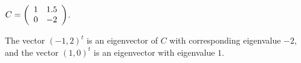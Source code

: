 \documentclass{ximera}
\begin{document}
\begin{computerExercise} \label{c4.5.5b}
$C=\left(\begin{array}{rr} 1 & 1.5\\ 0 &-2\end{array}\right)$.

\begin{solution}
The vector $(-1,2)^t$ is an eigenvector of $C$ with
corresponding eigenvalue $-2$, and the vector $(1,0)^t$ is an eigenvector
with eigenvalue $1$.


\end{solution}
\end{computerExercise}
\end{document}
